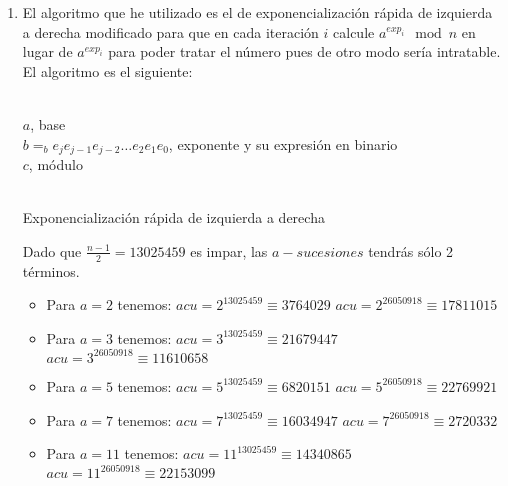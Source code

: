 	\begin{enumerate}
		\item El algoritmo que he utilizado es el de exponencialización rápida de izquierda a derecha modificado
		para que en cada iteración $i$ calcule $a^{exp_i} \mod{n}$ en lugar de $a^{exp_i}$ para poder tratar el
		número pues de otro modo sería intratable. El algoritmo es el siguiente:
		\begin{algorithm}[H]
			\begin{algorithmic}[1]
				\REQUIRE \ \\
					\texttt{$a$}, base \\
					\texttt{$b =_b e_je_{j-1}e_{j-2}\dots e_2e_1e_0$}, exponente y su expresión en binario \\
					\texttt{$c$}, módulo\\ \
					\ENDIF
				\ENDWHILE
			\end{algorithmic}
			\caption{Exponencialización rápida de izquierda a derecha}
			\label{Fast-exp}
		\end{algorithm}
		
		Dado que $\displaystyle \frac{n-1}{2} = 13025459$ es impar, las $a-sucesiones$ tendrás sólo 2 términos.
		
		\begin{itemize}
			\item Para $a = 2$ tenemos:
				$acu = 2^{13025459} \equiv 3764029$
				$acu = 2^{26050918} \equiv 17811015$
				
			\item Para $a = 3$ tenemos:
				$acu = 3^{13025459} \equiv 21679447$
				$acu = 3^{26050918} \equiv 11610658$
				
			\item Para $a = 5$ tenemos:
				$acu = 5^{13025459} \equiv 6820151$
				$acu = 5^{26050918} \equiv 22769921$
				
			\item Para $a = 7$ tenemos:
				$acu = 7^{13025459} \equiv 16034947$
				$acu = 7^{26050918} \equiv 2720332$
				
			\item Para $a = 11$ tenemos:
				$acu = 11^{13025459} \equiv 14340865$
				$acu = 11^{26050918} \equiv 22153099$
				

\end{itemize}
\end{enumerate}
